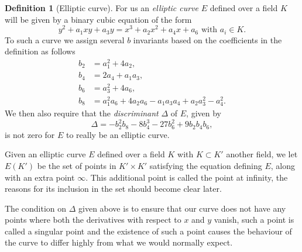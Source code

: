 \documentclass[12pt,a4paper,abstracton,bibtotoc]{scrreprt}
\theoremstyle{definition}
\newtheorem{defn}{Definition}
\begin{document}
\begin{defn}[Elliptic curve]
For us an \emph{elliptic curve} $E$ defined over a field $K$ will be given by a binary cubic equation of the form
\[
y^2 + a_1xy + a_3y = x^3 + a_2x^2 + a_4x + a_6\text{ with }a_i\in K.
\]
To such a curve we assign several $b$ invariants based on the coefficients in the definition as follows
\begin{align*}
b_2 &= a_1^2 + 4a_2,\\
b_4 &= 2a_4 + a_1a_3,\\
b_6 &= a_3^2 + 4a_6,\\
b_8 &= a_1^2a_6 + 4a_2a_6 - a_1a_3a_4 + a_2a_3^2 -a_4^2.
\end{align*}
We then also require that the \emph{discriminant} $\Delta$ of $E$, given by
\[
\Delta = -b_2^2b_8 -8b_4^3 -27b_6^2 +9b_2b_4b_6,
\]
is not zero for $E$ to really be an elliptic curve.

Given an elliptic curve $E$ defined over a field $K$ with $K \subset K'$ another field, we let $E(K')$ be the set of points in $K'\times K'$ satisfying the equation defining $E$, along with an extra point $\infty$.
This additional point is called the point at infinity, the reasons for its inclusion in the set should become clear later.
\end{defn}

The condition on $\Delta$ given above is to ensure that our curve does not have any points where both the derivatives with respect to $x$ and $y$ vanish, such a point is called a singular point and the existence of such a point causes the behaviour of the curve to differ highly from what we would normally expect.
\end{document}
